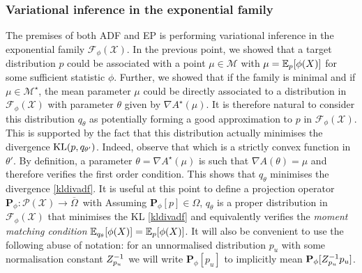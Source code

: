 
\subsubsection{Variational inference in the exponential family}
%
The premises of both ADF and EP is performing variational inference in the exponential family $\mathcal F_{\phi}(\mathcal X)$. In the previous point, we showed that a target distribution $p$ could be associated with a point $\mu\in\mathcal M$ with $\mu=\mathbb E_{p}[\phi(X)]$ for some sufficient statistic $\phi$. Further, we showed that if the family is minimal and if $\mu\in\mathcal M^{\star}$, the mean parameter $\mu$ could be directly associated to a distribution in $\mathcal F_{\phi}(\mathcal X)$ with parameter $\theta$ given by $\nabla A^{\star}(\mu)$. It is therefore natural to consider this distribution $q_{\theta}$ as potentially forming a good approximation to $p$ in $\mathcal F_{\phi}(\mathcal X)$.
%
This is supported by the fact that this distribution actually minimises the divergence $\mathrm{KL}\!\left(p,q_{\theta'}\right)$. Indeed, observe that
%
%
which is a strictly convex function in $\theta'$. By definition, a parameter $\theta=\nabla A^{\star}(\mu)$ is such that $\nabla A(\theta)=\mu$ and therefore verifies the first order condition. This shows that $q_{\theta}$ minimises the divergence \eqref{kldivadf}. It is useful at this point to define a projection operator $\mathbf P_{\phi}:\mathcal P(\mathcal X) \to \overline\Omega$\, with
%
%
Assuming $\mathbf P_{\phi}[p] \in \Omega$, $q_{\theta}$ is a proper distribution in $\mathcal F_{\phi}(\mathcal X)$ that minimises the KL \eqref{kldivadf} and equivalently verifies the \emph{moment matching  condition} $\mathbb E_{q_{\theta}}[\phi(X)]=\mathbb E_{p}[\phi(X)]$. It will also be convenient to use the following abuse of notation: for an unnormalised distribution $p_{u}$ with some normalisation constant $Z_{p_{u}}^{-1}$ we will write $\mathbf P_{\phi}[p_{u}]$ to implicitly mean $\mathbf P_{\phi}[Z_{p_{u}}^{-1} p_{u}]$.\\

